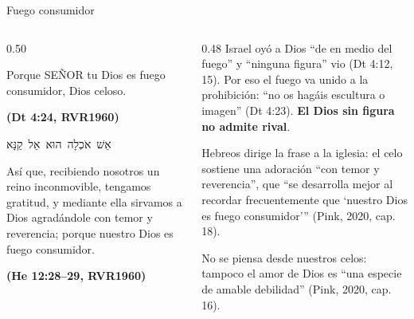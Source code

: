 \documentclass[hyperref={bookmarks=false},aspectratio=169]{beamer}
\newcommand{\heb}[1]{\mbox{\foreignlanguage{hebrew}{#1}}}
\newcommand{\SENOR}{S{\fontsize{0.78em}{1em}\selectfont EÑOR}}
\newcommand{\fuente}[1]{\par\hfill{\upshape\bfseries\footnotesize\textcolor{azul}{#1}}}
\newcommand{\destacar}[1]{\textbf{\textcolor{azul}{#1}}}
\begin{document}
\begin{frame}{Fuego consumidor}
\begin{columns}[t,onlytextwidth]
\begin{column}{0.50\textwidth}
\begin{cita}Porque \SENOR{} tu Dios es fuego consumidor, Dios celoso.\fuente{(Dt 4:24, RVR1960)}\end{cita}
\begin{center}\heb{אֵשׁ אֹכְלָה הוּא אֵל קַנָּא}\end{center}
\begin{cita}Así que, recibiendo nosotros un reino inconmovible, tengamos gratitud, y mediante ella sirvamos a Dios agradándole con temor y reverencia; porque nuestro Dios es fuego consumidor.\fuente{(He 12:28--29, RVR1960)}\end{cita}
\end{column}
\begin{column}{0.48\textwidth}\small
Israel oyó a Dios ``de en medio del fuego'' y ``ninguna figura'' vio (Dt 4:12, 15). Por eso el fuego va unido a la prohibición: ``no os hagáis escultura o imagen'' (Dt 4:23). \destacar{El Dios sin figura no admite rival}.\par\medskip
Hebreos dirige la frase a la iglesia: el celo sostiene una adoración ``con temor y reverencia'', que ``se desarrolla mejor al recordar frecuentemente que `nuestro Dios es fuego consumidor'{}'' (Pink, 2020, cap. 18).\par\medskip
No se piensa desde nuestros celos: tampoco el amor de Dios es ``una especie de amable debilidad'' (Pink, 2020, cap. 16).
\end{column}
\end{columns}
\end{frame}
\end{document}
